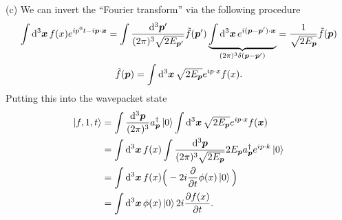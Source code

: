 {(c) We can invert the ``Fourier transform'' via the following procedure
\begin{gather}
    \int \dd[3]{\vb*{x}} f(x) e^{i p^{0} t - i \vb*{p} \cdot \vb*{x}} = \int \frac{\dd[3]{\vb*{p}'}}{(2 \pi)^3 \sqrt{2 E_{\vb*{p}'}}} \tilde{f}(\vb*{p}') \underbrace{ \int \dd[3]{\vb*{x}} e^{i ( \vb*{p} - \vb*{p}') \cdot \vb*{x}} }_{(2 \pi)^3 \delta(\vb*{p} - \vb*{p}')} = \frac{1}{\sqrt{2 E_{\vb*{p}}}} \tilde{f}(\vb*{p}) \nonumber \\
    \tilde{f}(\vb*{p}) = \int \dd[3]{\vb*{x}} \sqrt{2 E_{\vb*{p}}} e^{i p \cdot x} f(x)
.\end{gather}
Putting this into the wavepacket state
\begin{align}
    \ket{f,1,t} &= \int \frac{\dd[3]{\vb*{p}}}{(2 \pi)^3} a_{\vb*{p}}^{\dagger} \ket{0} \int \dd[3]{\vb*{x}} \sqrt{2 E_{\vb*{p}}} e^{i p \cdot x} f(\vb*{x}) \nonumber \\
                &= \int \dd[3]{\vb*{x}} f(x) \int \frac{\dd[3]{\vb*{p}}}{(2 \pi)^3 \sqrt{2 E_{\vb*{p}}}} 2 E_{\vb*{p}} a_{\vb*{p}}^{\dagger} e^{i p \cdot k} \ket{0} \nonumber \\
                &= \int \dd[3]{\vb*{x}} f(x) \Big( -2 i \pdv{t} \phi(x) \ket{0} \Big) \nonumber \\
                &= \int \dd[3]{\vb*{x}} \phi(x) \ket{0} 2 i \pdv{f(x)}{t}
.\end{align}


}
